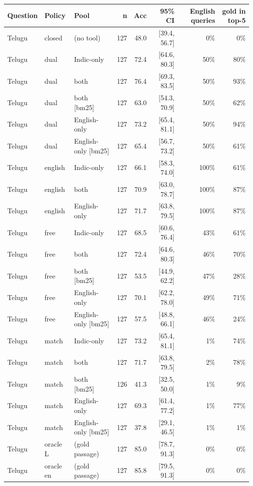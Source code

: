 \begin{table}[htbp]\centering\scriptsize
\begin{tabular}{lllrrrrr}
\toprule
Question & Policy & Pool & n & Acc & 95\% CI & English queries & gold in top-5 \\
\midrule
Telugu & closed & (no tool) & 127 & 48.0 & [39.4, 56.7] & 0\% & 0\% \\
Telugu & dual & Indic-only & 127 & 72.4 & [64.6, 80.3] & 50\% & 80\% \\
Telugu & dual & both & 127 & 76.4 & [69.3, 83.5] & 50\% & 93\% \\
Telugu & dual & both [bm25] & 127 & 63.0 & [54.3, 70.9] & 50\% & 62\% \\
Telugu & dual & English-only & 127 & 73.2 & [65.4, 81.1] & 50\% & 94\% \\
Telugu & dual & English-only [bm25] & 127 & 65.4 & [56.7, 73.2] & 50\% & 61\% \\
Telugu & english & Indic-only & 127 & 66.1 & [58.3, 74.0] & 100\% & 61\% \\
Telugu & english & both & 127 & 70.9 & [63.0, 78.7] & 100\% & 87\% \\
Telugu & english & English-only & 127 & 71.7 & [63.8, 79.5] & 100\% & 87\% \\
Telugu & free & Indic-only & 127 & 68.5 & [60.6, 76.4] & 43\% & 61\% \\
Telugu & free & both & 127 & 72.4 & [64.6, 80.3] & 46\% & 70\% \\
Telugu & free & both [bm25] & 127 & 53.5 & [44.9, 62.2] & 47\% & 28\% \\
Telugu & free & English-only & 127 & 70.1 & [62.2, 78.0] & 49\% & 71\% \\
Telugu & free & English-only [bm25] & 127 & 57.5 & [48.8, 66.1] & 46\% & 24\% \\
Telugu & match & Indic-only & 127 & 73.2 & [65.4, 81.1] & 1\% & 74\% \\
Telugu & match & both & 127 & 71.7 & [63.8, 79.5] & 2\% & 78\% \\
Telugu & match & both [bm25] & 126 & 41.3 & [32.5, 50.0] & 1\% & 9\% \\
Telugu & match & English-only & 127 & 69.3 & [61.4, 77.2] & 1\% & 77\% \\
Telugu & match & English-only [bm25] & 127 & 37.8 & [29.1, 46.5] & 1\% & 1\% \\
Telugu & oracle L & (gold passage) & 127 & 85.0 & [78.7, 91.3] & 0\% & 0\% \\
Telugu & oracle en & (gold passage) & 127 & 85.8 & [79.5, 91.3] & 0\% & 0\% \\

\end{tabular}
\end{table}
